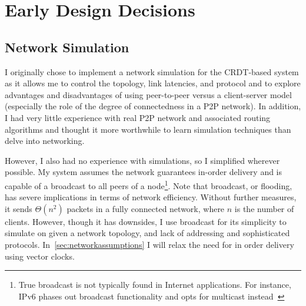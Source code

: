 \documentclass[12pt,a4paper,twoside,openright]{report}
\begin{document}
	
\section{Early Design Decisions}

	\subsection{Network Simulation}
	
	I originally chose to implement a network simulation for the CRDT-based system as it allows me to control the topology, link latencies, and protocol and to explore advantages and disadvantages of using peer-to-peer versus a client-server model (especially the role of the degree of connectedness in a P2P network). In addition, I had very little experience with real P2P network and associated routing algorithms and thought it more worthwhile to learn simulation techniques than delve into networking.
	
	However, I also had no experience with simulations, so I simplified wherever possible. My system assumes the network guarantees in-order delivery and is capable of a broadcast to all peers of a node\footnote{True broadcast is not typically found in Internet applications. For instance, IPv6 phases out broadcast functionality and opts for multicast instead~\cite{RFC2460}}. Note that broadcast, or flooding, has severe implications in terms of network efficiency. Without further measures, it sends $\Theta (n^{2})$ packets in a fully connected network, where $n$ is the number of clients. However, though it has downsides, I use broadcast for its simplicity to simulate on given a network topology, and lack of addressing and sophisticated protocols. In~\cref{sec:networkassumptions} I will relax the need for in order delivery using vector clocks.
	
	
	
\end{document}
